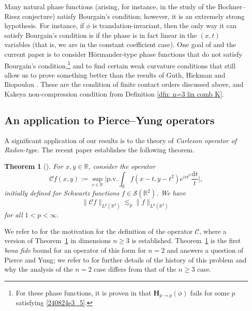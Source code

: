 \documentclass[reqno]{amsart}
\numberwithin{equation}{section}
\newcommand{\R}{\mathbb{R}}
\newcommand{\cC}{\mathcal{C}}
\newcommand{\cS}{\mathcal{S}}
\newcommand{\ud}{\mathrm{d}}
\newcommand{\bH}{\mathbf{H}}
\theoremstyle{plain}
\newtheorem{theorem}{Theorem}[section]
\theoremstyle{definition}
\begin{document}
Many natural phase functions (arising, for instance, in the study of the Bochner--Riesz conjecture) satisfy Bourgain's condition; however, it is an extremely strong hypothesis. For instance, if $\phi$ is translation-invariant, then the only way it can satisfy Bourgain's condition is if the phase is in fact linear in the $(x,t)$ variables (that is, we are in the constant coefficient case). One goal of \cite{dai2023oscillatory} and the current paper is to consider H\"ormander-type phase functions that do not satisfy Bourgain's condition,\footnote{For these phase functions, it is proven in \cite{guo2022dichotomy} that $\bH_{p\to p}(\phi)$ fails for some $p$ satisfying \eqref{240824e3_5}.} and to find certain weak curvature conditions that still allow us to prove something better than the results of Guth, Hickman and Iliopoulou \cite{GHI2019}. These are the condition of finite contact orders discussed above, and Kakeya non-compression condition from Definition \ref{dfn: n=3 lin comb K}. 






\subsection{An application to Pierce--Yung operators} A significant application of our results is to the theory of \textit{Carleson operator of Radon-type}. The recent paper \cite{BGH_PY} establishes the following theorem.

\begin{theorem}[\cite{BGH_PY}]\label{thm: PY}
For $x, y\in \R$, consider the operator
\begin{equation*}
    \cC f(x,y) := \sup_{v \in \R} \Big|\mathrm{p.v.} \int_\R f(x-t, y-t^2) e^{i v t^3} \frac{\ud t}{t} \Big|,
\end{equation*}
initially defined for Schwartz functions $f \in \cS(\R^2)$. 
We have 
\begin{equation*}
\|\cC f\|_{L^p(\R^2)} \lesssim_{p} \|f\|_{L^p(\R^2)}
\end{equation*}
for all $1 < p < \infty$. 
\end{theorem}

We refer to \cite{PY2019} for the motivation for the definition of the operator $\cC$, where a version of Theorem~\ref{thm: PY} in dimensions $n \geq 3$ is established. Theorem~\ref{thm: PY} is the first \textit{bona fide} bound for an operator of this form for $n = 2$ and answers a question of Pierce and Yung; we refer to \cite{BGH_PY} for further details of the history of this problem and why the analysis of the $n = 2$ case differs from that of the $n \geq 3$ case. 
\end{document}
